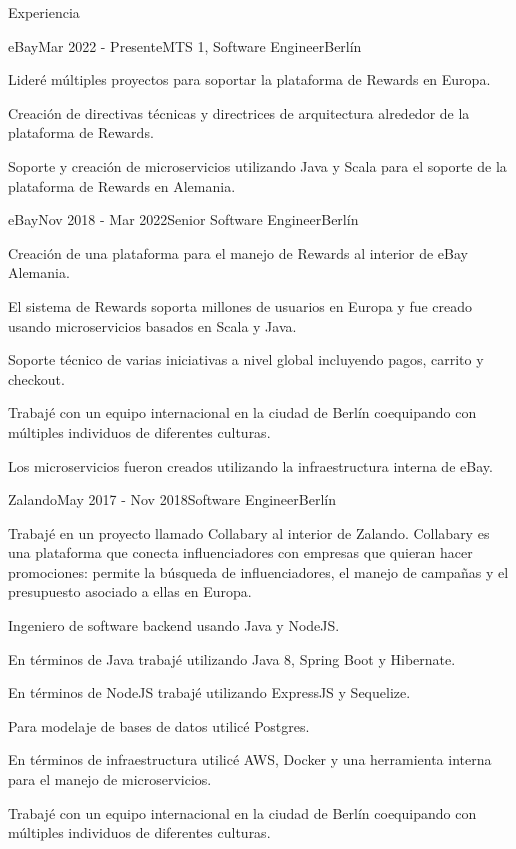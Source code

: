 \documentclass[spanish]{resume} %
\begin{document}
\begin{rSection}{Experiencia}

\begin{rSubsection}{eBay}{Mar 2022 - Presente}{MTS 1, Software Engineer}{Berl\'in}
\item Lider\'e m\'ultiples proyectos para soportar la plataforma de Rewards en Europa.
\item Creaci\'on de directivas t\'ecnicas y directrices de arquitectura alrededor de la plataforma de Rewards.
\item Soporte y creaci\'on de microservicios utilizando Java y Scala para el soporte de la plataforma de Rewards en Alemania.

\begin{rSubsection}{eBay}{Nov 2018 - Mar 2022}{Senior Software Engineer}{Berl\'in}
\item Creaci\'on de una plataforma para el manejo de Rewards al interior de eBay Alemania.
\item El sistema de Rewards soporta millones de usuarios en Europa y fue creado usando microservicios basados en Scala y Java.
\item Soporte t\'ecnico de varias iniciativas a nivel global incluyendo pagos, carrito y checkout.
\item Trabaj\'e con un equipo internacional en la ciudad de Berl\'in coequipando con m\'ultiples individuos de diferentes culturas.
\item Los microservicios fueron creados utilizando la infraestructura interna de eBay.


\begin{rSubsection}{Zalando}{May 2017 - Nov 2018}{Software Engineer}{Berl\'in}
\item Trabaj\'e en un proyecto llamado Collabary al interior de Zalando. Collabary es una plataforma que conecta influenciadores con empresas que quieran hacer promociones: permite la b\'usqueda de influenciadores, el manejo de campa\~nas y el presupuesto asociado a ellas en Europa.
\item Ingeniero de software backend usando Java y NodeJS.
\item En t\'erminos de Java trabaj\'e utilizando Java 8, Spring Boot y Hibernate.
\item En t\'erminos de NodeJS trabaj\'e utilizando ExpressJS y Sequelize.
\item Para modelaje de bases de datos utilic\'e Postgres.
\item En t\'erminos de infraestructura utilic\'e AWS, Docker y una herramienta interna para el manejo de microservicios.
\item Trabaj\'e con un equipo internacional en la ciudad de Berl\'in coequipando con m\'ultiples individuos de diferentes culturas.



\end{rSubsection}
\end{rSubsection}
\end{rSubsection}
\end{rSection}
\end{document}
